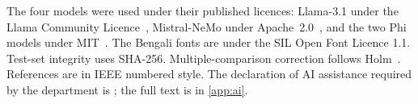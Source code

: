 The four models were used under their published licences: Llama-3.1 under the Llama Community Licence~\cite{grattafiori2024llama}, Mistral-NeMo under Apache~2.0~\cite{mistral2024nemo}, and the two Phi models under MIT~\cite{abdin2024phi3,microsoft2025phi4mini}. The Bengali fonts are under the SIL Open Font Licence 1.1. Test-set integrity uses SHA-256. Multiple-comparison correction follows Holm~\cite{holm1979simple}. References are in IEEE numbered style. The declaration of AI assistance required by the department is ; the full text is in \cref{app:ai}.
